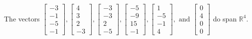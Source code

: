 \begin{exercise}
\begin{exerciseStatement}
  \end{exerciseStatement}
  \begin{exerciseAnswer}
   The vectors \(\left[\begin{array}{r}
-3 \\
-1 \\
-5 \\
-1
\end{array}\right] , \left[\begin{array}{r}
4 \\
3 \\
2 \\
-3
\end{array}\right] , \left[\begin{array}{r}
-3 \\
-3 \\
2 \\
-5
\end{array}\right] , \left[\begin{array}{r}
-5 \\
-9 \\
15 \\
-1
\end{array}\right] , \left[\begin{array}{r}
1 \\
-5 \\
-1 \\
4
\end{array}\right] , \text{ and } \left[\begin{array}{r}
0 \\
4 \\
0 \\
0
\end{array}\right]\) 
  	 do  
	span \(\mathbb{R}^4\).
  


  \end{exerciseAnswer}
\end{exercise}